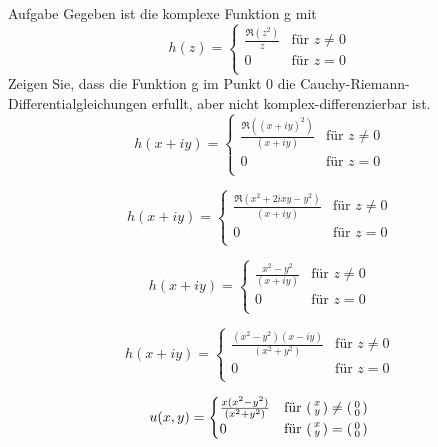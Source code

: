 \documentclass{scrartcl}
\begin{document}
\begin{section}{Aufgabe}%
Gegeben ist die komplexe Funktion g mit
\[h(z)=\begin{cases} 
\frac{\Re\left(z^2\right)}{z} & \text{für } z\neq 0 \\
 0 & \text{für } z=0 \\
   \end{cases}\]
Zeigen Sie, dass die Funktion g im Punkt 0 die Cauchy-Riemann-Differentialgleichungen
erfullt, aber nicht komplex-differenzierbar ist. 
\[h(x+iy)=\begin{cases} 
\frac{\Re\left((x+iy)^2\right)}{(x+iy)} & \text{für } z\neq 0 \\
 0 & \text{für } z=0 \\
   \end{cases}\]

\[h(x+iy)=\begin{cases} 
\frac{\Re\left(x^2 + 2 i x y - y^2\right)}{(x+iy)} & \text{für } z\neq 0 \\
 0 & \text{für } z=0 \\
   \end{cases}\]

\[h(x+iy)=\begin{cases} 
\frac{x^2 - y^2}{(x+iy)} & \text{für } z\neq 0 \\
 0 & \text{für } z=0 \\
   \end{cases} \]

\[h(x+iy)=\begin{cases} 
\frac{(x^2 - y^2)(x-iy)}{(x^2+y^2)} & \text{für } z\neq 0 \\
 0 & \text{für } z=0 \\
   \end{cases} \]

\[u(x,y)=\begin{cases} 
\frac{x(x^2 - y^2)}{(x^2+y^2)} & \text{für } 
     \begin{psmallmatrix}x \\y \end{psmallmatrix}
     \neq 
     \begin{psmallmatrix}0\\0 \end{psmallmatrix}
      \\
 0 & \text{für } 
     \begin{psmallmatrix}x \\y \end{psmallmatrix}
     =
     \begin{psmallmatrix}0\\0 \end{psmallmatrix}
     \\
   \end{cases}\]
   

\end{section}
\end{document}
